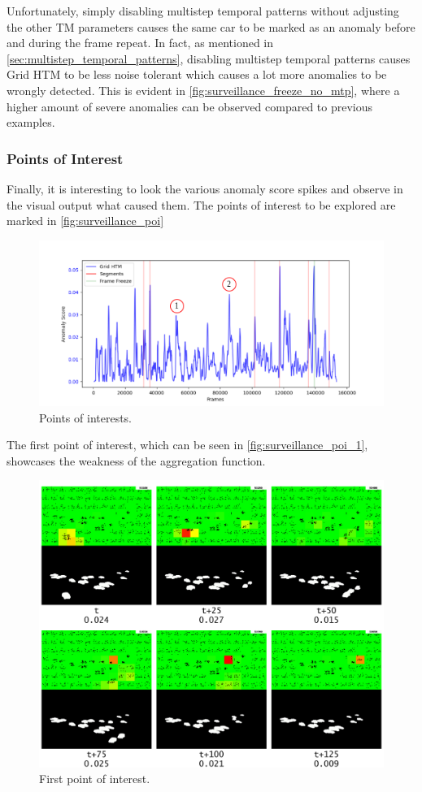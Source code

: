 Unfortunately, simply disabling multistep temporal patterns without adjusting the other TM parameters causes the same car to be marked as an anomaly before and during the frame repeat. In fact, as mentioned in \autoref{sec:multistep_temporal_patterns}, disabling multistep temporal patterns causes Grid HTM to be less noise tolerant which causes a lot more anomalies to be wrongly detected. This is evident in \autoref{fig:surveillance_freeze_no_mtp}, where a higher amount of severe anomalies can be observed compared to previous examples.
\subsubsection{Points of Interest}
Finally, it is interesting to look the various anomaly score spikes and observe in the visual output what caused them. The points of interest to be explored are marked in \autoref{fig:surveillance_poi}
\begin{figure}[H]
    \centering
    \includegraphics[width=\textwidth]{resources/experiments/surveillance/surveillance_result_poi.png}
    \caption{Points of interests.}
    \label{fig:surveillance_poi}
\end{figure}
The first point of interest, which can be seen in \autoref{fig:surveillance_poi_1}, showcases the weakness of the aggregation function.
\begin{figure}[H]
    \centering
    \includegraphics[width=\textwidth]{resources/experiments/surveillance/surveillance_poi_1.png}
    \caption{First point of interest.}
    \label{fig:surveillance_poi_1}
\end{figure}
